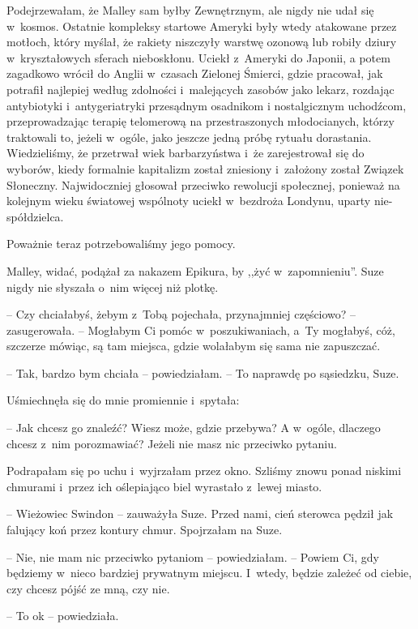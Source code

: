 \documentclass[oneside,polish,11pt,sfheadings]{mwbk}
\begin{document}
Podejrzewałam, że Malley sam byłby Zewnętrznym, ale nigdy nie udał się w~kosmos. Ostatnie kompleksy startowe Ameryki były wtedy atakowane przez
motłoch, który myślał, że rakiety niszczyły warstwę ozonową lub robiły
dziury w~kryształowych sferach nieboskłonu. Uciekł z~Ameryki do Japonii,
a potem zagadkowo wrócił do Anglii w~czasach Zielonej Śmierci, gdzie
pracował, jak potrafił najlepiej według zdolności i~malejących zasobów
jako lekarz, rozdając antybiotyki i~antygeriatryki przesądnym osadnikom
i nostalgicznym uchodźcom, przeprowadzając terapię telomerową na
przestraszonych młodocianych, którzy traktowali to, jeżeli w~ogóle, jako
jeszcze jedną próbę rytuału dorastania. Wiedzieliśmy, że przetrwał wiek
barbarzyństwa i~że zarejestrował się do wyborów, kiedy formalnie
kapitalizm został zniesiony i~założony został Związek Słoneczny.
Najwidoczniej głosował przeciwko rewolucji społecznej, ponieważ na
kolejnym wieku światowej wspólnoty uciekł w~bezdroża Londynu, uparty
nie-spółdzielca.

Poważnie teraz potrzebowaliśmy jego pomocy.

Malley, widać, podążał za nakazem Epikura, by ,,żyć w~zapomnieniu''.
Suze nigdy nie słyszała o~nim więcej niż plotkę.

-- Czy chciałabyś, żebym z~Tobą pojechała, przynajmniej częściowo? -- zasugerowała. -- Mogłabym Ci pomóc w~poszukiwaniach, a~Ty mogłabyś, cóż,
szczerze mówiąc, są tam miejsca, gdzie wolałabym się sama nie
zapuszczać.

-- Tak, bardzo bym chciała -- powiedziałam. -- To naprawdę po sąsiedzku,
Suze.

Uśmiechnęła się do mnie promiennie i~spytała: 

-- Jak chcesz go znaleźć?
Wiesz może, gdzie przebywa? A w~ogóle, dlaczego chcesz z~nim
porozmawiać? Jeżeli nie masz nic przeciwko pytaniu.

Podrapałam się po uchu i~wyjrzałam przez okno. Szliśmy znowu ponad
niskimi chmurami i~przez ich oślepiająco biel wyrastało z~lewej miasto.

-- Wieżowiec Swindon -- zauważyła Suze. Przed nami, cień sterowca pędził
jak falujący koń przez kontury chmur. Spojrzałam na Suze.

-- Nie, nie mam nic przeciwko pytaniom -- powiedziałam. -- Powiem Ci, gdy
będziemy w~nieco bardziej prywatnym miejscu. I~wtedy, będzie zależeć od
ciebie, czy chcesz pójść ze mną, czy nie.

-- To ok -- powiedziała.
\end{document}
